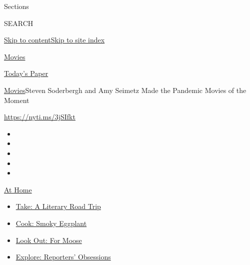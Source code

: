 Sections

SEARCH

\protect\hyperlink{site-content}{Skip to
content}\protect\hyperlink{site-index}{Skip to site index}

\href{https://www.nytimes3xbfgragh.onion/section/movies}{Movies}

\href{https://myaccount.nytimes3xbfgragh.onion/auth/login?response_type=cookie\&client_id=vi}{}

\href{https://www.nytimes3xbfgragh.onion/section/todayspaper}{Today's
Paper}

\href{/section/movies}{Movies}\textbar{}Steven Soderbergh and Amy
Seimetz Made the Pandemic Movies of the Moment

\url{https://nyti.ms/3jSIfkt}

\begin{itemize}
\item
\item
\item
\item
\item
\end{itemize}

\href{https://www.nytimes3xbfgragh.onion/spotlight/at-home?action=click\&pgtype=Article\&state=default\&region=TOP_BANNER\&context=at_home_menu}{At
Home}

\begin{itemize}
\tightlist
\item
  \href{https://www.nytimes3xbfgragh.onion/2020/07/28/books/time-for-a-literary-road-trip.html?action=click\&pgtype=Article\&state=default\&region=TOP_BANNER\&context=at_home_menu}{Take:
  A Literary Road Trip}
\item
  \href{https://www.nytimes3xbfgragh.onion/2020/07/29/magazine/bored-with-your-home-cooking-some-smoky-eggplant-will-fix-that.html?action=click\&pgtype=Article\&state=default\&region=TOP_BANNER\&context=at_home_menu}{Cook:
  Smoky Eggplant}
\item
  \href{https://www.nytimes3xbfgragh.onion/2020/07/27/travel/moose-michigan-isle-royale.html?action=click\&pgtype=Article\&state=default\&region=TOP_BANNER\&context=at_home_menu}{Look
  Out: For Moose}
\item
  \href{https://www.nytimes3xbfgragh.onion/interactive/2020/at-home/even-more-reporters-editors-diaries-lists-recommendations.html?action=click\&pgtype=Article\&state=default\&region=TOP_BANNER\&context=at_home_menu}{Explore:
  Reporters' Obsessions}
\end{itemize}

